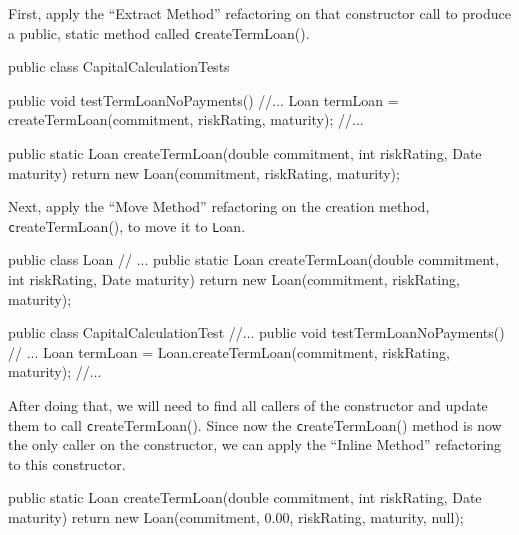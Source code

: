 \documentclass[a4paper,11pt]{memoir}
\newcommand{\code}[1]{{\texttt #1}}
\begin{document}
\begin{exercise}
	First, apply the ``Extract Method'' refactoring on that constructor call to produce a public, static method called \code{createTermLoan()}.
\end{exercise}
\begin{solution}
\begin{java}
public class CapitalCalculationTests{
	public void testTermLoanNoPayments() {
      //...
      Loan termLoan = createTermLoan(commitment, riskRating, maturity);
      //...
   }
   
	public static Loan createTermLoan(double commitment, int riskRating, Date maturity) {
		return new Loan(commitment, riskRating, maturity);
	}
}
\end{java}	
\end{solution}

\begin{exercise}
	Next, apply the ``Move Method'' refactoring on the creation method, \code{createTermLoan()}, to move it to \code{Loan}. 
\end{exercise}
\begin{solution}
\begin{java}
public class Loan {
    // ...
    public static Loan createTermLoan(double commitment, int riskRating, Date maturity) {
        return new Loan(commitment, riskRating, maturity);
    }
}

public class CapitalCalculationTest {
    //...
    public void testTermLoanNoPayments() {
        // ...
        Loan termLoan = Loan.createTermLoan(commitment, riskRating, maturity);
        //...
   }
}
\end{java}
\end{solution}

\begin{exercise}
After doing that, we will need to find all callers of the constructor and update them to call \code{createTermLoan()}.
Since now the \code{createTermLoan()} method is now the only caller on the constructor, we can apply the ``Inline Method''
refactoring to this constructor.
\end{exercise}

\begin{solution}
\begin{java}
public static Loan createTermLoan(double commitment, int riskRating, Date maturity) {
    return new Loan(commitment, 0.00, riskRating, maturity, null);
}        
\end{java}
\end{solution}
\end{document}
